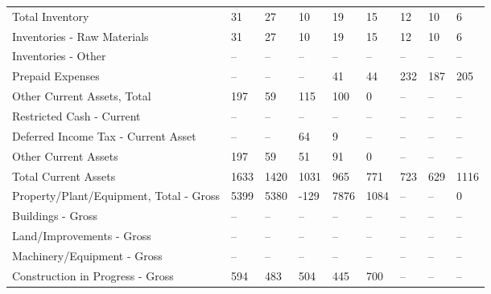 \documentclass[grad,numbers]{coppe}
\begin{document}
\begin{longtable}[t]{lllllllll}
  \hspace{1em}Total Inventory & 31 & 27 & 10 & 19 & 15 & 12 & 10 & 6\\
  \hspace{1em}\hspace{1em}Inventories - Raw Materials & 31 & 27 & 10 & 19 & 15 & 12 & 10 & 6\\
  \hspace{1em}\hspace{1em}Inventories - Other & -- & -- & -- & -- & -- & -- & -- & --\\
  \hspace{1em}Prepaid Expenses & -- & -- & -- & 41 & 44 & 232 & 187 & 205\\
  \hspace{1em}Other Current Assets, Total & 197 & 59 & 115 & 100 & 0 & -- & -- & --\\
  \hspace{1em}\hspace{1em}Restricted Cash - Current & -- & -- & -- & -- & -- & -- & -- & --\\
  \hspace{1em}\hspace{1em}Deferred Income Tax - Current Asset & -- & -- & 64 & 9 & -- & -- & -- & --\\
  \hspace{1em}\hspace{1em}Other Current Assets & 197 & 59 & 51 & 91 & 0 & -- & -- & --\\
  \hspace{1em}Total Current Assets & 1633 & 1420 & 1031 & 965 & 771 & 723 & 629 & 1116\\
  \hspace{1em}Property/Plant/Equipment, Total - Gross & 5399 & 5380 & -129 & 7876 & 1084 & -- & -- & 0\\
  \hspace{1em}\hspace{1em}Buildings - Gross & -- & -- & -- & -- & -- & -- & -- & --\\
  \hspace{1em}\hspace{1em}Land/Improvements - Gross & -- & -- & -- & -- & -- & -- & -- & --\\
  \hspace{1em}\hspace{1em}Machinery/Equipment - Gross & -- & -- & -- & -- & -- & -- & -- & --\\
  \hspace{1em}\hspace{1em}Construction in Progress - Gross & 594 & 483 & 504 & 445 & 700 & -- & -- & --\\

\end{longtable}
\end{document}
